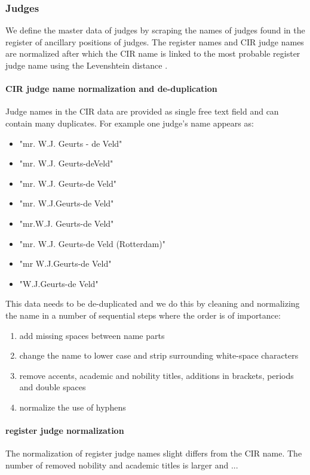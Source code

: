 \subsubsection{Judges}
We define the master data of judges by scraping the names of judges found in the register of ancillary positions of judges\cite{rechtspraak:nevenfuncties}. The register names and CIR judge names are normalized after which the CIR name is linked to the most probable register judge name using the Levenshtein distance .

\paragraph{CIR judge name normalization and de-duplication}
Judge names in the CIR data are provided as single free text field and can contain many duplicates. For example one judge's name appears as:

\begin{itemize}
\item "mr. W.J. Geurts - de Veld"
\item "mr. W.J. Geurts-deVeld"
\item "mr. W.J. Geurts-de Veld"
\item "mr. W.J.Geurts-de Veld"
\item "mr.W.J. Geurts-de Veld"
\item "mr. W.J. Geurts-de Veld (Rotterdam)"
\item "mr W.J.Geurts-de Veld"
\item "W.J.Geurts-de Veld"
\end{itemize}

This data needs to be de-duplicated and we do this by cleaning and normalizing the name in a number of sequential steps where the order is of importance:
\begin{enumerate}
\item add missing spaces between name parts
\item change the name to lower case and strip surrounding white-space characters
\item remove accents, academic and nobility titles, additions in brackets, periods and double spaces
\item normalize the use of hyphens
\end{enumerate}

\paragraph{register judge normalization}
The normalization of register judge names slight differs from the CIR name. The number of removed nobility and academic titles is larger and ...

